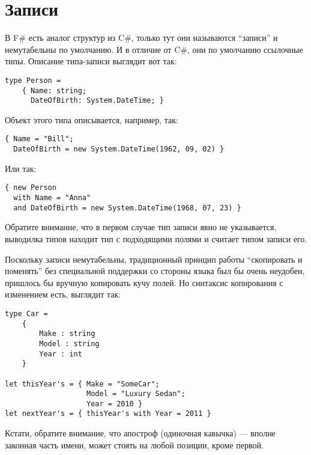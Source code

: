 \documentclass[a5paper]{article}
\begin{document}
\section{Записи}

В F\# есть аналог структур из C\#, только тут они называются ``записи'' и немутабельны по умолчанию. И в отличие от C\#, они по умолчанию ссылочные типы. Описание типа-записи выглядит вот так:

\begin{verbatim}
type Person =
    { Name: string;
      DateOfBirth: System.DateTime; }
\end{verbatim}

Объект этого типа описывается, например, так:

\begin{verbatim}
{ Name = "Bill"; 
  DateOfBirth = new System.DateTime(1962, 09, 02) }
\end{verbatim}

Или так:

\begin{verbatim}
{ new Person
  with Name = "Anna"
  and DateOfBirth = new System.DateTime(1968, 07, 23) }
\end{verbatim}

Обратите внимание, что в первом случае тип записи явно не указывается, выводилка типов находит тип с подходящими полями и считает типом записи его.

Поскольку записи немутабельны, традиционный принцип работы ``скопировать и поменять'' без специальной поддержки со стороны языка был бы очень неудобен, пришлось бы вручную копировать кучу полей. Но синтаксис копирования с изменением есть, выглядит так:

\begin{verbatim}
type Car =
    {
        Make : string
        Model : string
        Year : int
    }

let thisYear's = { Make = "SomeCar"; 
                   Model = "Luxury Sedan"; 
                   Year = 2010 }
let nextYear's = { thisYear's with Year = 2011 }
\end{verbatim}

Кстати, обратите внимание, что апостроф (одиночная кавычка) --- вполне законная часть имени, может стоять на любой позиции, кроме первой.
\end{document}
